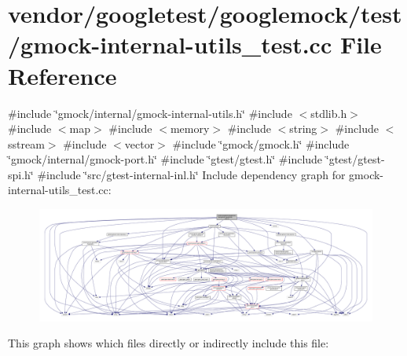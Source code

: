 \hypertarget{gmock-internal-utils__test_8cc}{}\section{vendor/googletest/googlemock/test/gmock-\/internal-\/utils\+\_\+test.cc File Reference}
\label{gmock-internal-utils__test_8cc}
{\ttfamily \#include \char`\"{}gmock/internal/gmock-\/internal-\/utils.\+h\char`\"{}}\newline
{\ttfamily \#include $<$stdlib.\+h$>$}\newline
{\ttfamily \#include $<$map$>$}\newline
{\ttfamily \#include $<$memory$>$}\newline
{\ttfamily \#include $<$string$>$}\newline
{\ttfamily \#include $<$sstream$>$}\newline
{\ttfamily \#include $<$vector$>$}\newline
{\ttfamily \#include \char`\"{}gmock/gmock.\+h\char`\"{}}\newline
{\ttfamily \#include \char`\"{}gmock/internal/gmock-\/port.\+h\char`\"{}}\newline
{\ttfamily \#include \char`\"{}gtest/gtest.\+h\char`\"{}}\newline
{\ttfamily \#include \char`\"{}gtest/gtest-\/spi.\+h\char`\"{}}\newline
{\ttfamily \#include \char`\"{}src/gtest-\/internal-\/inl.\+h\char`\"{}}\newline
Include dependency graph for gmock-\/internal-\/utils\+\_\+test.cc\+:
\nopagebreak
\begin{figure}[H]
\begin{center}
\leavevmode
\includegraphics[width=350pt]{gmock-internal-utils__test_8cc__incl}
\end{center}
\end{figure}
This graph shows which files directly or indirectly include this file\+:
\nopagebreak
